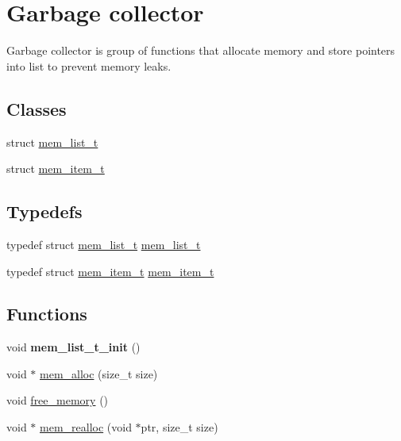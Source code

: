 \hypertarget{group__garbage__collector}{}\section{Garbage collector}
\label{group__garbage__collector}


Garbage collector is group of functions that allocate memory and store pointers into list to prevent memory leaks.  


\subsection*{Classes}
\begin{DoxyCompactItemize}
\item 
struct \hyperlink{structmem__list__t}{mem\+\_\+list\+\_\+t}
\item 
struct \hyperlink{structmem__item__t}{mem\+\_\+item\+\_\+t}
\end{DoxyCompactItemize}
\subsection*{Typedefs}
\begin{DoxyCompactItemize}
\item 
typedef struct \hyperlink{structmem__list__t}{mem\+\_\+list\+\_\+t} \hyperlink{group__garbage__collector_ga36b1703faf3c854ab706e2d1565d0675}{mem\+\_\+list\+\_\+t}
\item 
typedef struct \hyperlink{structmem__item__t}{mem\+\_\+item\+\_\+t} \hyperlink{group__garbage__collector_ga45f8d443bc7a0cc8c6fd0c12d59626b0}{mem\+\_\+item\+\_\+t}
\end{DoxyCompactItemize}
\subsection*{Functions}
\begin{DoxyCompactItemize}
\item 
\hypertarget{group__garbage__collector_ga6fbe32445893d321b600470e950ee540}{}void {\bfseries mem\+\_\+list\+\_\+t\+\_\+init} ()\label{group__garbage__collector_ga6fbe32445893d321b600470e950ee540}

\item 
void $\ast$ \hyperlink{group__garbage__collector_gafc112ff977fb81bd172f5bb58bbcf19a}{mem\+\_\+alloc} (size\+\_\+t size)
\item 
void \hyperlink{group__garbage__collector_ga9f81a9a3690fcba7180fa860e0c2422f}{free\+\_\+memory} ()
\item 
void $\ast$ \hyperlink{group__garbage__collector_ga5f27a409c8a3e15b2288de524163687b}{mem\+\_\+realloc} (void $\ast$ptr, size\+\_\+t size)
\end{DoxyCompactItemize}
